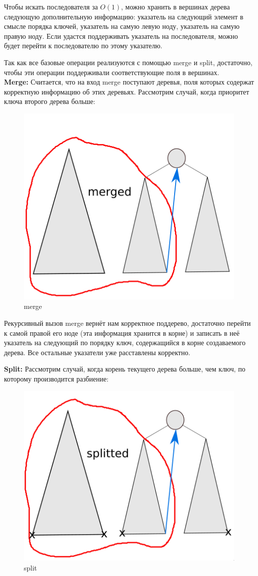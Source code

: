 \documentclass[12pt]{article}
\newenvironment{problem}[2][Задача]{\begin{trivlist}
\item[\hskip \labelsep {\bfseries #1}\hskip \labelsep {\bfseries #2.}]}{\end{trivlist}}
\begin{document}
\begin{problem}{4b}
    Чтобы искать последователя за $O(1)$, можно хранить в вершинах дерева
    следующую дополнительную информацию: указатель на следующий элемент в смысле
    порядка ключей, указатель на самую левую ноду, указатель на самую правую
    ноду. Если удастся поддерживать указатель на последователя, можно будет перейти
    к последователю по этому указателю.

    Так как все базовые операции реализуются с помощью merge и split, достаточно,
    чтобы эти операции поддерживали соответствующие поля в вершинах.\\
    
    \textbf{Merge:} Считается, что на вход merge поступают деревья, поля которых
    содержат корректную информацию об этих деревьях. Рассмотрим случай, когда 
    приоритет ключа второго дерева больше:

    \begin{figure}[H]
        \centering
        \includegraphics[width=0.4\linewidth]{Problem4_merge.png}
        \caption{merge}
    \end{figure}

    Рекурсивный вызов merge вернёт нам корректное поддерево, достаточно перейти 
    к самой правой его ноде (эта информация хранится в корне) и записать в неё
    указатель на следующий по порядку ключ, содержащийся в корне создаваемого 
    дерева. Все остальные указатели уже расставлены корректно.

    \textbf{Split:} Рассмотрим случай, когда корень текущего дерева больше, чем
    ключ, по которому производится разбиение:

    \begin{figure}[H]
        \centering
        \includegraphics[width=0.4\linewidth]{Problem4_split.png}
        \caption{split}
    \end{figure}


\end{problem}
\end{document}
